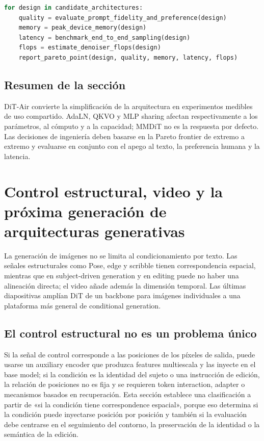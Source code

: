 \documentclass[a4paper]{article}
\begin{document}
\begin{lstlisting}[language=Python,caption={Comparar las opciones de uso compartido con indicadores de Pareto, no solo ordenarlas por una única puntuación de calidad}]
for design in candidate_architectures:
    quality = evaluate_prompt_fidelity_and_preference(design)
    memory = peak_device_memory(design)
    latency = benchmark_end_to_end_sampling(design)
    flops = estimate_denoiser_flops(design)
    report_pareto_point(design, quality, memory, latency, flops)
\end{lstlisting}

\subsection{Resumen de la sección}

DiT-Air convierte la simplificación de la arquitectura en experimentos medibles de uso compartido. AdaLN, QKVO y MLP sharing afectan respectivamente a los parámetros, al cómputo y a la capacidad; MMDiT no es la respuesta por defecto. Las decisiones de ingeniería deben basarse en la Pareto frontier de extremo a extremo y evaluarse en conjunto con el apego al texto, la preferencia humana y la latencia.
\section{Control estructural, video y la próxima generación de arquitecturas generativas}

La generación de imágenes no se limita al condicionamiento por texto. Las señales estructurales como Pose, edge y scribble tienen correspondencia espacial, mientras que en subject-driven generation y en editing puede no haber una alineación directa; el video añade además la dimensión temporal. Las últimas diapositivas amplían DiT de un backbone para imágenes individuales a una plataforma más general de conditional generation.

\subsection{El control estructural no es un problema único}

Si la señal de control corresponde a las posiciones de los píxeles de salida, puede usarse un auxiliary encoder que produzca features multiescala y las inyecte en el base model; si la condición es la identidad del sujeto o una instrucción de edición, la relación de posiciones no es fija y se requieren token interaction, adapter o mecanismos basados en recuperación. Esta sección establece una clasificación a partir de «si la condición tiene correspondence espacial», porque eso determina si la condición puede inyectarse posición por posición y también si la evaluación debe centrarse en el seguimiento del contorno, la preservación de la identidad o la semántica de la edición.
\end{document}
